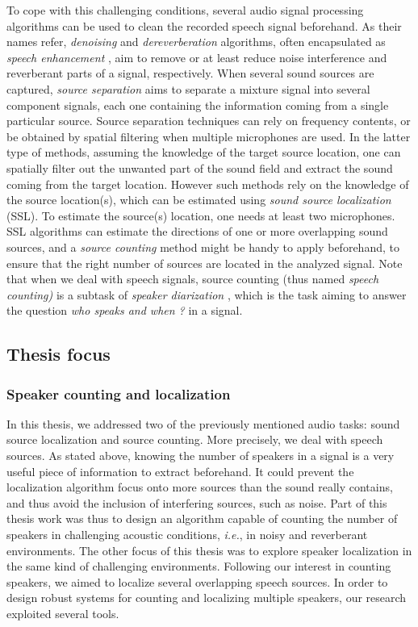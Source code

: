 To cope with this challenging conditions, several audio signal processing algorithms can be used to clean the recorded speech signal beforehand. As their names refer, \textit{denoising} and \textit{dereverberation} algorithms, often encapsulated as \textit{speech enhancement} \cite{vincent_audio_2018}, aim to remove or at least reduce noise interference and reverberant parts of a signal, respectively. When several sound sources are captured, \textit{source separation} \cite{wang_supervised_2018} aims to separate a mixture signal into several component signals, each one containing the information coming from a single particular source. Source separation techniques can rely on frequency contents, or be obtained by spatial filtering when multiple microphones are used. In the latter type of methods, assuming the knowledge of the target source location, one can spatially filter out the unwanted part of the sound field and extract the sound coming from the target location. However such methods rely on the knowledge of the source location(s), which can be estimated using \textit{sound source  localization} (SSL). To estimate the source(s) location, one needs at least two microphones. SSL algorithms can estimate the directions of one or more overlapping sound sources, and a \textit{source counting} method might be handy to apply beforehand, to ensure that the right number of sources are located in the analyzed signal. Note that when we deal with speech signals, source counting (thus named \textit{speech counting)} is a subtask of \textit{speaker diarization} \cite{anguera_speaker_2012,tranter_overview_2006,park_review_2021}, which is the task aiming to answer the question \textit{who speaks and when ?} in a signal.

\subsection{Thesis focus}

\subsubsection{Speaker counting and localization}
In this thesis, we addressed two of the previously mentioned audio tasks: sound source localization and source counting. More precisely, we deal with speech sources. As stated above, knowing the number of speakers in a signal is a very useful piece of information to extract beforehand. It could prevent the localization algorithm focus onto more sources than the sound really contains, and thus avoid the inclusion of interfering sources, such as noise. Part of this thesis work was thus to design an algorithm capable of counting the number of speakers in challenging acoustic conditions, \emph{i.e.}, in noisy and reverberant environments. The other focus of this thesis was to explore speaker localization in the same kind of challenging environments. Following our interest in counting speakers, we aimed to localize several overlapping speech sources. In order to design robust systems for counting and localizing multiple speakers, our research exploited several tools. 

